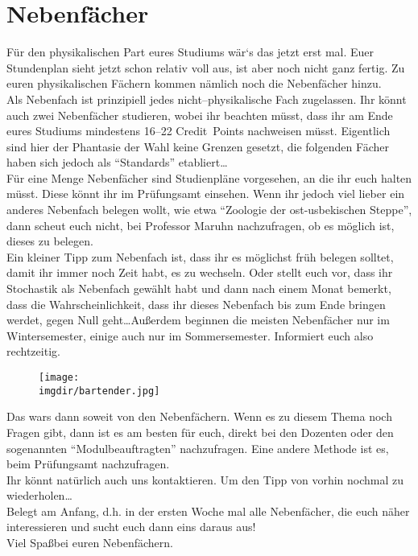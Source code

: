 \section{Nebenfächer}
\label{sec:nebenfach}
Für den physikalischen Part eures Studiums wär`s das jetzt erst mal. Euer Stundenplan sieht jetzt schon relativ voll aus, ist aber noch nicht ganz fertig. Zu euren physikalischen Fächern kommen nämlich noch die Nebenfächer hinzu.\\
Als Nebenfach ist prinzipiell jedes nicht--physikalische Fach zugelassen. Ihr könnt auch zwei Nebenfächer studieren, wobei ihr beachten müsst, dass ihr am Ende eures Studiums mindestens 16--22 Credit~Points nachweisen müsst. Eigentlich sind hier der Phantasie der Wahl keine Grenzen gesetzt, die folgenden Fächer haben sich jedoch als \enquote{Standards} etabliert\ldots\\
Für eine Menge Nebenfächer sind Studienpläne vorgesehen, an die ihr euch halten müsst. Diese könnt ihr im Prüfungsamt einsehen. Wenn ihr jedoch viel lieber ein anderes Nebenfach belegen wollt, wie etwa \enquote{Zoologie der ost-usbekischen Steppe}, dann scheut euch nicht, bei Professor Maruhn nachzufragen, ob es möglich ist, dieses zu belegen.\\
Ein kleiner Tipp zum Nebenfach ist, dass ihr es möglichst früh belegen solltet, damit ihr immer noch Zeit habt, es zu wechseln. Oder stellt euch vor, dass ihr Stochastik als Nebenfach gewählt habt und dann nach einem Monat bemerkt, dass die Wahrscheinlichkeit, dass ihr dieses Nebenfach bis zum Ende bringen werdet, gegen Null geht\ldots Au\ss erdem beginnen die meisten Nebenfächer nur im Wintersemester, einige auch nur im Sommersemester. Informiert euch also rechtzeitig.
\begin{figure}
	\centering
	\texttt{[image: \\imgdir/bartender.jpg]}
\end{figure}
\newpage









\bigskip
Das wars dann soweit von den Nebenfächern. Wenn es zu diesem Thema noch Fragen gibt, dann ist es am besten für euch, direkt bei den Dozenten oder den sogenannten \enquote{Modulbeauftragten} nachzufragen. Eine andere Methode ist es, beim Prüfungsamt nachzufragen.\\
Ihr könnt natürlich auch uns kontaktieren. Um den Tipp von vorhin nochmal zu wiederholen\ldots\\
Belegt am Anfang, d.h. in der ersten Woche mal alle Nebenfächer, die euch näher interessieren und sucht euch dann eins daraus aus!\\
Viel Spa\ss\space bei euren Nebenfächern.